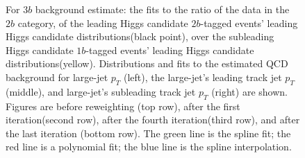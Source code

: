 \begin{figure}[htbp!]
\begin{center}
\caption{For $3b$ background estimate: the fits to the ratio of the data in the $2b$ category, of the leading Higgs candidate $2b$-tagged events' leading Higgs candidate distributions(black point), over the subleading Higgs candidate $1b$-tagged events' leading Higgs candidate distributions(yellow). Distributions and fits to the estimated QCD background for large-\R jet $p_{T}$ (left),  the large-\R jet's leading track jet $p_T$ (middle), and large-\R jet's subleading track jet $p_T$ (right) are shown.  Figures are before reweighting (top row), after the first iteration(second row), after the fourth iteration(third row), and after the last iteration (bottom row). The green line is the spline fit; the red line is a polynomial fit; the blue line is the spline interpolation.}
\label{fig:rw-3b-subl}
\end{center}
\end{figure}

